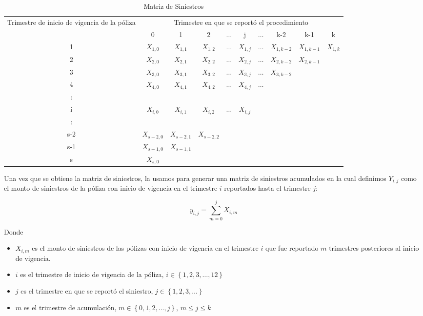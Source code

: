 \documentclass[11pt,twoside,openright,spanish]{report}
\numberwithin{equation}{chapter}
\numberwithin{figure}{chapter}
\numberwithin{table}{chapter}
\begin{document}
	\begin{table}[ht]
	\centering
		\caption{Matriz de Siniestros}
	\begin{tabularx}{\linewidth}{c|ccccccccc}
		\multirow{2}{4cm}{Trimestre de inicio de vigencia de la póliza} & \multicolumn{9}{c}{Trimestre en que se reportó el procedimiento} \\
			& 0  & 1 & 2 & $ \dots $ & j & $\dots $ & k-2 & k-1 &  k \\
		\midrule
		1      &  $X_{1,0}^{}$ & $X_{1,1}^{}$ & $X_{1,2}^{}$ & $ \dots $ & $X_{1,j}^{}$ & $ \dots $ & $X_{1,k-2}^{}$ & $X_{1,k-1}^{}$ & $X_{1,k}^{}$ \\
		2      &  $X_{2,0}^{}$ & $X_{2,1}^{}$ & $X_{2,2}^{}$ & $ \dots $ & $X_{2,j}^{}$ & $ \dots $ & $X_{2,k-2}^{}$ & $X_{2,k-1}^{}$ & \\
		3      &  $X_{3,0}^{}$ & $X_{3,1}^{}$ & $X_{3,2}^{}$ & $ \dots $ & $X_{3,j}^{}$ & $ \dots $ & $X_{3,k-2}^{}$ & & \\
		4      &  $X_{4,0}^{}$ & $X_{4,1}^{}$ & $X_{4,2}^{}$ & $ \dots $ & $X_{4,j}^{}$ & $ \dots $ & & & \\
		:      & & & & & & & & &\\
		i      &  $X_{i,0}^{}$ & $X_{i,1}^{}$ & $X_{i,2}^{}$ & $ \dots $ & $X_{i,j}^{}$ & & & & \\
		:      & & & & & & & & & \\
		s-2      &  $X_{s-2,0}^{}$ & $X_{s-2,1}^{}$ & $X_{s-2,2}^{}$ & & & & & & \\
		s-1      &  $X_{s-1,0}^{}$ & $X_{s-1,1}^{}$ & & & & & & & \\
		s      &  $X_{s,0}^{}$ & & & & & & & & \\
	\end{tabularx}
	\end{table}

	\vspace{1cm}

	Una vez que se obtiene la matriz de siniestros, la usamos para generar una matriz de siniestros acumulados en la cual definimos ${Y}_{i,j}$ como el monto de siniestros de la póliza con inicio de vigencia en el trimestre $i$ reportados hasta el trimestre $j$:
	
	\begin{equation}
	{y}_{i,j}=\sum _{m=0}^{j}{X}_{i,m}
		\label{eq1}
	\end{equation}

	Donde
	
	\begin{itemize}
	\setlength\itemsep{-0.5em}
		\item ${X}_{i,m}$ es el monto de siniestros de las pólizas con inicio de vigencia en el trimestre $i$ que fue reportado $m$ trimestres posteriores al inicio de vigencia.
		\item $i$ es el trimestre de inicio de vigencia de la póliza, $i\in \left\{1,2,3,\dots ,12\right\}$
		\item $j$ es el trimestre en que se reportó el siniestro,  $j\in \left\{1,2,3,\dots\right\}$
		\item $m$ es el trimestre de acumulación, $m\in \left\{0,1,2,\dots ,j\right\}$, $m\le j\le k$
	\end{itemize} 
	
\end{document}
